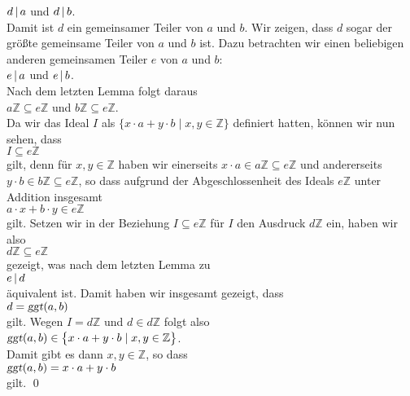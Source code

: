 $d \,|\, a$ \quad und \quad $d \,|\, b$.
\\[0.2cm]
Damit ist $d$ ein gemeinsamer Teiler von $a$ und $b$.  Wir zeigen, dass $d$ sogar der größte gemeinsame
Teiler von $a$ und $b$ ist.  Dazu betrachten wir einen beliebigen anderen gemeinsamen Teiler $e$ von $a$ und
$b$: 
\\[0.2cm]
\hspace*{1.3cm}
$e \,|\, a$ \quad und \quad $e \,|\, b$.
\\[0.2cm]
Nach dem letzten Lemma folgt daraus
\\[0.2cm]
\hspace*{1.3cm}
$a\mathbb{Z} \subseteq e\mathbb{Z}$ \quad und \quad $b\mathbb{Z} \subseteq e\mathbb{Z}$.
\\[0.2cm]
Da wir das Ideal $I$ als $\bigl\{ x \cdot a + y \cdot b \mid x,y \in \mathbb{Z} \bigr\}$ definiert hatten,
können wir nun sehen, dass 
\\[0.2cm]
\hspace*{1.3cm}
$I \subseteq e\mathbb{Z}$
\\[0.2cm]
gilt, denn für $x,y \in \mathbb{Z}$ haben wir einerseits $x \cdot a \in a\mathbb{Z} \subseteq e\mathbb{Z}$
und andererseits $y \cdot b \in b\mathbb{Z} \subseteq e\mathbb{Z}$, so dass aufgrund der Abgeschlossenheit
des Ideals $e\mathbb{Z}$ unter Addition insgesamt
\\[0.2cm]
\hspace*{1.3cm}
$a \cdot x + b \cdot y \in e\mathbb{Z}$
\\[0.2cm]
gilt.  Setzen wir in der Beziehung $I \subseteq e\mathbb{Z}$ für $I$ den Ausdruck $d\mathbb{Z}$ ein, haben
wir also 
\\[0.2cm]
\hspace*{1.3cm}
$d\mathbb{Z} \subseteq e\mathbb{Z}$
\\[0.2cm]
gezeigt, was nach dem letzten Lemma zu
\\[0.2cm]
\hspace*{1.3cm}
$e \,|\, d$
\\[0.2cm]
äquivalent ist.  Damit haben wir insgesamt gezeigt, dass
\\[0.2cm]
\hspace*{1.3cm}
 $d = \textsl{ggt}(a,b)$ 
\\[0.2cm]
gilt.  Wegen $I = d\mathbb{Z}$ und $d \in d\mathbb{Z}$ folgt also 
\\[0.2cm]
\hspace*{1.3cm}
$\textsl{ggt}(a,b) \in \bigl\{ x \cdot a + y \cdot b \mid x,y \in \mathbb{Z} \bigr\}$.
\\[0.2cm]
Damit gibt es dann $x,y \in \mathbb{Z}$, so dass
\\[0.2cm]
\hspace*{1.3cm}
$\textsl{ggt}(a,b) = x \cdot a + y \cdot b$
\\[0.2cm]
gilt.  \qed

